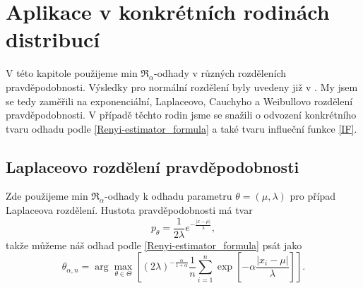 
\chapter{Aplikace v konkrétních rodinách distribucí}

V této kapitole použijeme min $\mathfrak{R}_\alpha$-odhady v různých rozděleních pravděpodobnosti. Výsledky pro normální rozdělení byly uvedeny již v \cite{Demut2010}. My jsem se tedy zaměřili na exponenciální, Laplaceovo, Cauchyho a Weibullovo rozdělení pravděpodobnosti. V případě těchto rodin jsme se snažili o odvození konkrétního tvaru odhadu podle \eqref{Renyi-estimator_formula} a také tvaru influeční funkce \eqref{IF}.

\section{Laplaceovo rozdělení pravděpodobnosti}

Zde použijeme min $\mathfrak{R}_\alpha$-odhady k odhadu parametru $\theta = (\mu,\lambda)$ pro případ Laplaceova rozdělení. Hustota pravděpodobnosti má tvar 
\begin{equation}
	p_\theta = \frac{1}{2\lambda} e^{-\frac{|x-\mu|}{\lambda}}, 
\end{equation}
takže můžeme náš odhad podle \eqref{Renyi-estimator_formula}  psát jako 
\begin{equation}
	\theta_{\alpha,n} = \arg \max_{\theta \in \Theta} \left[ (2\lambda)^{-\frac{\alpha}{1+\alpha}} \frac{1}{n} \sum_{i=1}^n \exp \left[-\alpha\frac{|x_i-\mu|}{\lambda} \right] \right].
\end{equation}


